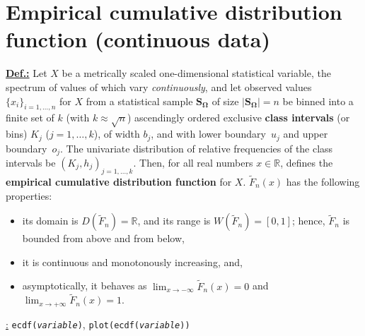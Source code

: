\section[Empirical cumulative distribution function (continuous
data)]{Empirical cumulative distribution function (continuous
data)}
\underline{\textbf{Def.:}} Let $X$ be a metrically scaled
one-dimensional statistical variable, the spectrum of values of 
which vary \textit{continuously}, and let observed values 
$\{x_{i}\}_{i=1,\ldots,n}$ for $X$ from a statistical sample 
$\boldsymbol{S_{\Omega}}$ of size $|\boldsymbol{S_{\Omega}}|=n$ be 
binned into a finite set of $k$ (with $k \approx \sqrt{n}$) 
ascendingly ordered exclusive \textbf{class intervals} (or bins) 
$K_{j}$ ($j=1,\ldots,k$), of width $b_{j}$, and with lower 
boundary~$u_{j}$ and upper boundary~$o_{j}$. The univariate 
distribution of relative frequencies of the class intervals be 
$(K_{j},h_{j})_{j=1,\ldots,k}$. Then, for all real numbers $x \in 
\mathbb{R}$,
%
\be
{}
\ee
%
defines the \textbf{empirical cumulative distribution function}
for $X$. $\tilde{F}_{n}(x)$ has the following properties:
%
\begin{itemize}

\item its domain is $D(\tilde{F}_{n})=\mathbb{R}$, and its
range is $W(\tilde{F}_{n})=[0,1]$; hence, $\tilde{F}_{n}$ is 
bounded from above and from below,

\item it is continuous and monotonously increasing, and,

\item asymptotically, it behaves as ${\displaystyle\lim_{x\to 
-\infty}\tilde{F}_{n}(x)=0}$ and ${\displaystyle\lim_{x\to 
+\infty}\tilde{F}_{n}(x)=1}$.
\end{itemize}
%

\medskip
\noindent
\underline{\R:} \texttt{ecdf(\textit{variable})},
\texttt{plot(ecdf(\textit{variable}))}

